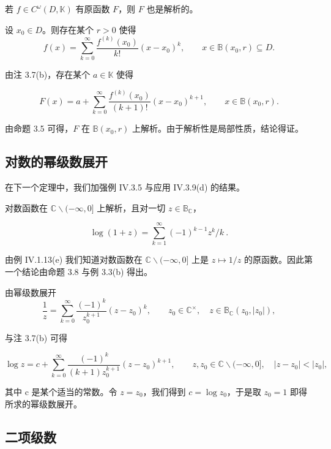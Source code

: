 \begin{proposition}

若 $ f \in C^\omega(D, \mathbb{K}) $ 有原函数 $ F $，则 $ F $ 也是解析的。

\proofhead
设 $ x_0 \in D $。则存在某个 $ r > 0 $ 使得
\[
f(x)=\sum_{k=0}^{\infty}\frac{f^{(k)}(x_{0})}{k!}(x-x_{0})^{k},\qquad x\in\mathbb{B}(x_{0},r)\subseteq D.
\]

由注 3.7(b)，存在某个 $ a \in \mathbb{K} $ 使得

\begin{equation}
F(x)=a+\sum_{k=0}^{\infty}\frac{f^{(k)}(x_{0})}{(k+1)!}(x-x_{0})^{k+1},\qquad x\in\mathbb{B}(x_{0},r).
\end{equation}

由命题 3.5 可得，$F$ 在 $\mathbb{B}(x_0, r)$ 上解析。由于解析性是局部性质，结论得证。

\end{proposition}

\subsection*{对数的幂级数展开}

在下一个定理中，我们加强例 IV.3.5 与应用 IV.3.9(d) 的结果。

\begin{theorem}

对数函数在 $ \mathbb{C}\backslash(-\infty,0] $ 上解析，且对一切 $ z \in \mathbb{B}_{\mathbb{C}} $，

\[
\log(1+z)=\sum_{k=1}^{\infty}(-1)^{k-1}z^{k}/k~.
\]

\proofhead
由例 IV.1.13(e) 我们知道对数函数在 $ \mathbb{C}\backslash(-\infty,0] $ 上是 $ z \mapsto 1/z $ 的原函数。因此第一个结论由命题 3.8 与例 3.3(b) 得出。

由幂级数展开
\[
\frac{1}{z}=\sum_{k=0}^{\infty}\frac{(-1)^{k}}{z_{0}^{k+1}}(z-z_{0})^{k},\qquad z_{0}\in\mathbb{C}^{\times},\quad z\in\mathbb{B}_{\mathbb{C}}(z_{0},|z_{0}|),
\]

与注 3.7(b) 可得

\[
\log z=c+\sum_{k=0}^{\infty}\frac{(-1)^{k}}{(k+1)z_{0}^{k+1}}(z-z_{0})^{k+1},\qquad z,z_{0}\in\mathbb{C}\backslash(-\infty,0],\quad|z-z_{0}|<|z_{0}|,
\]

其中 c 是某个适当的常数。令 $ z = z_0 $，我们得到 $ c = \log z_0 $，于是取 $ z_0 = 1 $ 即得所求的幂级数展开。

\end{theorem}

\subsection*{二项级数}

